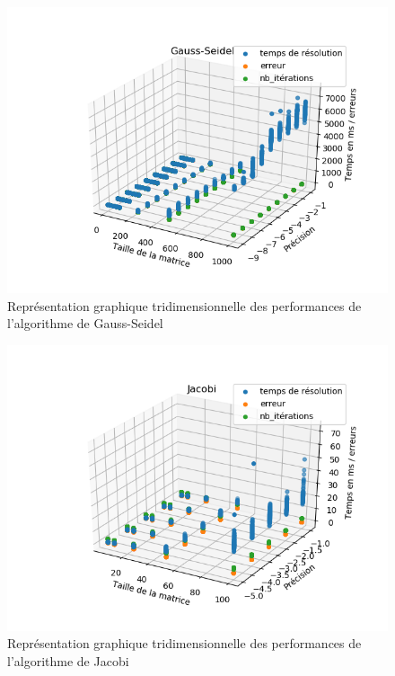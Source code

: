 \begin{figure}[H]
	\includegraphics{../codes/Data/gauss-seidel3D.png}
	\caption{Représentation graphique tridimensionnelle des performances de l'algorithme de Gauss-Seidel}
\end{figure}

\begin{figure}[H]
	\includegraphics{../codes/Data/jacobi3D.png}
	\caption{Représentation graphique tridimensionnelle des performances de l'algorithme de Jacobi}
\end{figure}

